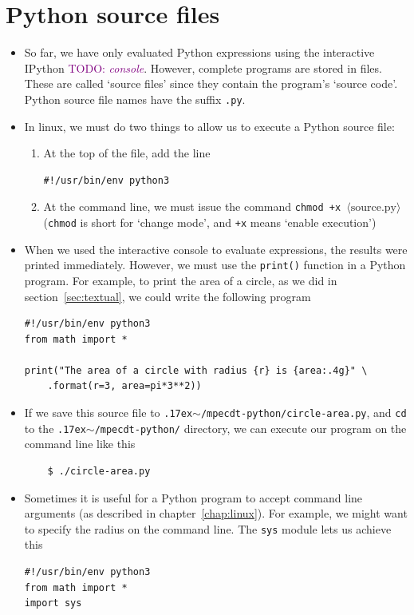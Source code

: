 \documentclass[a4paper,twoside]{memoir}
\newcommand{\shellcmd}{\texttt}
\newcommand{\shellvar}[1]{$\langle \text{#1}\rangle$}
\newcommand{\TODO}[1]{\textcolor{purple}{TODO: \emph{#1}}}
\newcommand{\home}{\raise.17ex\hbox{$\scriptstyle\mathtt{\sim}$}}
\begin{document}
\section{Python source files}
\begin{itemize}
\item So far, we have only evaluated Python expressions using the interactive IPython \TODO{console}.  However, complete programs are stored in files.  These are called `source files' since they contain the program's `source code'.  Python source file names have the suffix \shellcmd{.py}.
\item In linux, we must do two things to allow us to execute a Python source file:
\begin{enumerate}
	\item At the top of the file, add the line
\begin{verbatim}
#!/usr/bin/env python3
\end{verbatim}
	\item At the command line, we must issue the command \shellcmd{chmod +x \shellvar{source.py}} (\shellcmd{chmod} is short for `change mode', and \shellcmd{+x} means `enable execution')
\end{enumerate}
\item When we used the interactive console to evaluate expressions, the results were printed immediately.  However, we must use the \shellcmd{print()} function in a Python program.  For example, to print the area of a circle, as we did in section~\ref{sec:textual}, we could write the following program
\begin{verbatim}
#!/usr/bin/env python3
from math import *

print("The area of a circle with radius {r} is {area:.4g}" \
	.format(r=3, area=pi*3**2))
\end{verbatim}
\item If we save this source file to \shellcmd{\home/mpecdt-python/circle-area.py}, and \shellcmd{cd} to the \shellcmd{\home/mpecdt-python/} directory, we can execute our program on the command line like this
\begin{verbatim}
	$ ./circle-area.py
\end{verbatim}
\item Sometimes it is useful for a Python program to accept command line arguments (as described in chapter~\ref{chap:linux}).  For example, we might want to specify the radius on the command line.  The \shellcmd{sys} module lets us achieve this
\begin{verbatim}
#!/usr/bin/env python3
from math import *
import sys


\end{verbatim}
\end{itemize}
\end{document}
